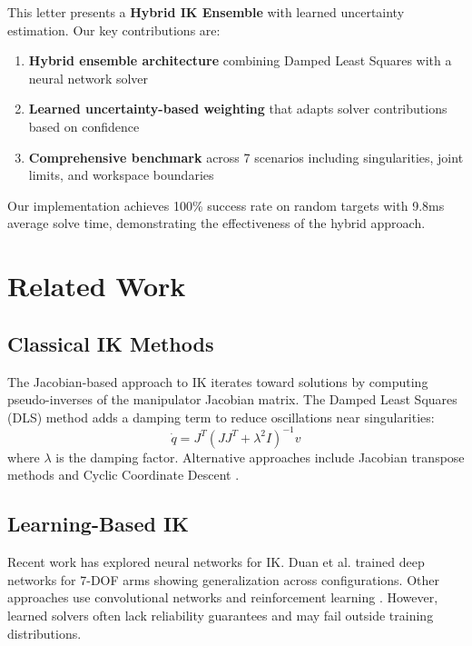 {{This letter presents a \textbf{Hybrid IK Ensemble} with learned uncertainty estimation. Our key contributions are:

\begin{enumerate}
    \item \textbf{Hybrid ensemble architecture} combining Damped Least Squares with a neural network solver
    \item \textbf{Learned uncertainty-based weighting} that adapts solver contributions based on confidence
    \item \textbf{Comprehensive benchmark} across 7 scenarios including singularities, joint limits, and workspace boundaries
\end{enumerate}

Our implementation achieves 100\% success rate on random targets with 9.8ms average solve time, demonstrating the effectiveness of the hybrid approach.

\section{Related Work}

\subsection{Classical IK Methods}
The Jacobian-based approach to IK iterates toward solutions by computing pseudo-inverses of the manipulator Jacobian matrix. The Damped Least Squares (DLS) method \cite{nakamura1986inverse} adds a damping term to reduce oscillations near singularities:
\begin{equation}
\dot{q} = J^T (JJ^T + \lambda^2 I)^{-1} v
\end{equation}
where $\lambda$ is the damping factor. Alternative approaches include Jacobian transpose methods and Cyclic Coordinate Descent \cite{whitney1972resolved}.

\subsection{Learning-Based IK}
Recent work has explored neural networks for IK. Duan et al. \cite{duan2018one} trained deep networks for 7-DOF arms showing generalization across configurations. Other approaches use convolutional networks \cite{levine2016learning} and reinforcement learning \cite{haarnoja2018learning}. However, learned solvers often lack reliability guarantees and may fail outside training distributions.

}}

